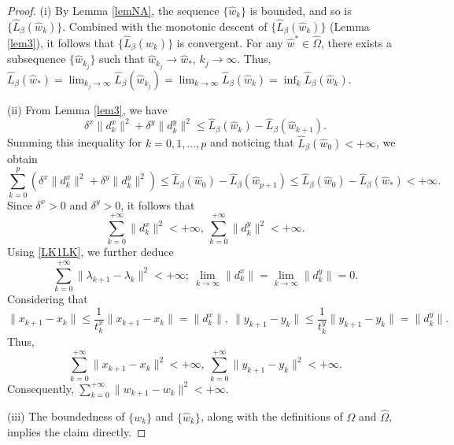 \documentclass[10pt,a4paper]{amsart}
\begin{document}
\begin{proof}
(i) By Lemma \ref{lemNA}, the sequence $\{\hat{w}_{k}\}$ is bounded, and so is $\{\hat{L}_{\beta}(\hat{w}_{k})\}$. Combined with the monotonic descent of $\{\hat{L}_{\beta}(\hat{w}_{k})\}$ (Lemma \ref{lem3}), it follows that $\{\hat{L}_{\beta}(\hat{w}_{k})\}$ is convergent. For any $\hat{w}^*\in \hat{\Omega}$, there exists a subsequence $\{\hat{w}_{k_j}\}$ such that $\hat{w}_{k_j} \to \hat{w}_*$, $k_j\to\infty$. Thus,
$\hat{L}_{\beta}(\hat{w}_*)=\lim_{k_j \to \infty }\hat{L}_{\beta}(\hat{w}_{k_j})=\lim_{k \to \infty }\hat{L}_{\beta}(\hat{w}_{k})=\inf_{k}\hat{L}_{\beta}(\hat{w}_k)$.

(ii) From Lemma \ref{lem3}, we have
\[	\delta^x\|d_{k}^x\|^2+\delta^y\|d_{k}^y\|^2\leq\hat{L}_{\beta}(\hat{w}_{k}) -\hat{L}_{\beta}(\hat{w}_{k+1}).\]
Summing this inequality for $k=0,1, \dots, p$ and noticing that $\hat{L}_{\beta}(\hat {w}_{0})<+\infty$, we obtain
\[	
\sum_{k=0}^p(\delta^x\|d_{k}^x\|^2+\delta^y\|d_{k}^y\|^2)\leq\hat{L}_{\beta}(\hat{w}_{0}) -\hat{L}_{\beta}(\hat{w}_{p+1})
\leq\hat{L}_{\beta}(\hat{w}_{0}) -\hat{L}_{\beta}(\hat{w}_{*})<+\infty.
\]
Since $\delta^x>0$ and $\delta^y>0$, it follows that
\[\sum_{k=0}^{+\infty} \|d_k^x\|^2<+\infty,~\sum_{k=0}^{+\infty} \|d_k^y\|^2<+\infty.\]
Using \eqref{LK1LK}, we further deduce
\[
\sum_{k=0}^{+\infty} \|{\lambda}_{k+1}-\lambda_{k}\|^2<+\infty;\ \lim_{k\to\infty}\|d_k^x\|=\lim_{k\to\infty}\|d_k^y\|=0.
\]
Considering that
\begin{equation}\label{xleqd}
\|x_{k+1}-x_k\|\leq \frac{1}{t_k^x}\|{x}_{k+1}-x_{k}\|=\|d_k^x\|,\ \|y_{k+1}-y_k\|\leq \frac{1}{t_k^y}\|{y}_{k+1}-y_{k}\|=\|d_k^y\|.
\end{equation}
Thus,
\[\sum_{k=0}^{+\infty}\|x_{k+1}-x_k\|^2<+\infty,~\sum_{k=0}^{+\infty}\|y_{k+1}-y_k\|^2<+\infty.\]
Consequently, $\sum_{k=0}^{+\infty}\|w_{k+1}-w_k\|^2<+\infty$.

(iii) The boundedness of $\{w_{k}\}$ and $\{\hat{w}_{k}\}$, along with the definitions of $\Omega$ and $\hat{\Omega}$, implies the claim directly.


\end{proof}
\end{document}
